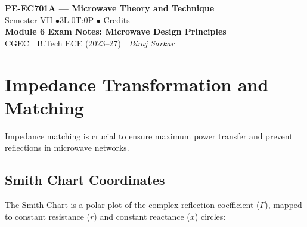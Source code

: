 \documentclass[12pt,a4paper]{article}
\begin{document}

\begin{center}
  {\LARGE\bfseries\color{myred} PE-EC701A --- Microwave Theory and Technique}\\[5pt]
  {\normalsize\color{mydark} Semester VII \quad$\bullet$\quad 3L:0T:0P \quad$\bullet$ Credits}\\[3pt]
  {\normalsize\color{myteal}\textbf{Module 6 Exam Notes: Microwave Design Principles}}\\[3pt]
  {\small\color{mydark} CGEC \;$|$\; B.Tech ECE (2023--27) \;$|$\; \textit{Biraj Sarkar}}
\end{center}
\vspace{2pt}
\noindent{\color{myred}\rule{\linewidth}{1.5pt}}
\vspace{2pt}

\hypersetup{linkcolor=mydark}
\tableofcontents
\hypersetup{linkcolor=myteal}
\newpage

\section{Impedance Transformation and Matching}

Impedance matching is crucial to ensure maximum power transfer and prevent reflections in microwave networks.

\subsection{Smith Chart Coordinates}
The Smith Chart is a polar plot of the complex reflection coefficient ($\Gamma$), mapped to constant resistance ($r$) and constant reactance ($x$) circles:
\end{document}
